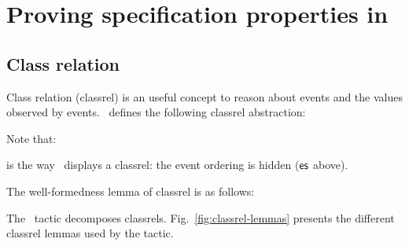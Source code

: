 \documentclass[final]{article}
\begin{document}


\section{Proving specification properties in \nuprl}

\subsection{Class relation}

Class relation (classrel) is an useful concept to reason about events
and the values observed by events.  \nuprl\ defines the following
classrel abstraction:
\begin{center}
  \begin{small}
    
  \end{small}
\end{center}

Note that:
\begin{center}
  \begin{small}
    
  \end{small}
\end{center}
is the way \nuprl\ displays a classrel: the event ordering is hidden
($\mathsf{es}$ above).

The well-formedness lemma of classrel is as follows:
\begin{center}
  \begin{small}
    
  \end{small}
\end{center}

The \nuprl\ tactic  decomposes classrels.
Fig.~\ref{fig:classrel-lemmas} presents the different classrel lemmas
used by the  tactic.
\end{document}
